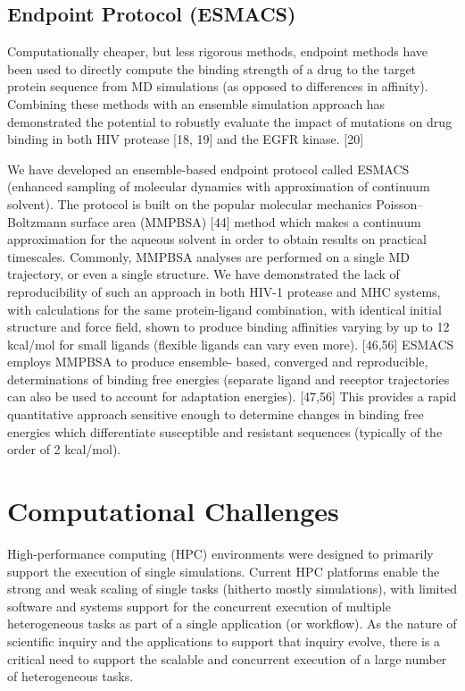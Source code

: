 \documentclass[conference]{IEEEtran}
\begin{document}
\subsection{Endpoint Protocol (ESMACS)}\label{sec:esmacs}

Computationally cheaper, but less rigorous methods, endpoint methods have been used to directly compute the binding strength of a drug to the target protein sequence from MD simulations (as opposed to differences in affinity). Combining these methods with an ensemble simulation approach has demonstrated the potential to robustly evaluate the impact of mutations on drug binding in both HIV protease [18, 19] and the EGFR kinase. [20]     

We have developed an ensemble-based endpoint protocol called ESMACS (enhanced sampling of molecular dynamics with approximation of continuum solvent). The protocol is built on the popular molecular mechanics Poisson–Boltzmann surface area (MMPBSA) [44] method which makes a continuum approximation for the aqueous solvent in order to obtain results on practical timescales. Commonly, MMPBSA analyses are performed on a single MD trajectory, or even a single structure. We have demonstrated the lack of reproducibility of such an approach in both HIV-1 protease and MHC systems, with calculations for the same protein-ligand combination, with identical initial structure and force field, shown to produce binding affinities varying by up to 12 kcal/mol for small ligands (flexible ligands can vary even more). [46,56] ESMACS employs MMPBSA to produce ensemble- based, converged and reproducible, determinations of binding free energies (separate ligand and receptor trajectories can also be used to account for adaptation energies). [47,56] This provides a rapid quantitative approach sensitive enough to determine changes in binding free energies which differentiate susceptible and resistant sequences (typically of the order of 2 kcal/mol).

\section{Computational Challenges}\label{sec:cc}

High-performance computing (HPC) environments were designed to primarily
support the execution of single simulations. Current HPC platforms enable the
strong and weak scaling of single tasks (hitherto mostly simulations), with
limited software and systems support for the concurrent execution of multiple
heterogeneous tasks as part of a single application (or workflow). As the
nature of scientific inquiry and the applications to support that inquiry
evolve, there is a critical need to support the scalable and concurrent
execution of a large number of heterogeneous tasks.
\end{document}
